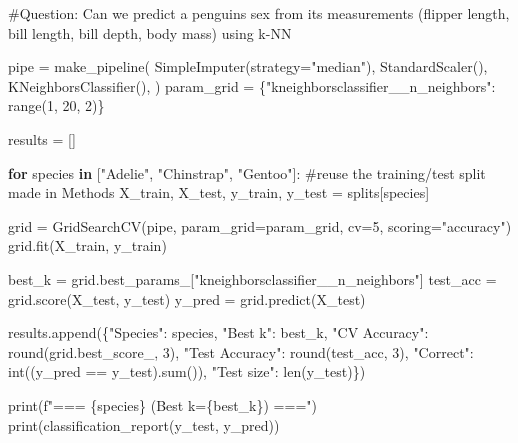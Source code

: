 \documentclass[
  letterpaper,
  DIV=11,
  numbers=noendperiod]{scrartcl}
\newenvironment{Shaded}{\begin{snugshade}}{\end{snugshade}}
\newcommand{\BuiltInTok}[1]{\textcolor[rgb]{0.00,0.23,0.31}{#1}}
\newcommand{\CommentTok}[1]{\textcolor[rgb]{0.37,0.37,0.37}{#1}}
\newcommand{\ControlFlowTok}[1]{\textcolor[rgb]{0.00,0.23,0.31}{\textbf{#1}}}
\newcommand{\DecValTok}[1]{\textcolor[rgb]{0.68,0.00,0.00}{#1}}
\newcommand{\KeywordTok}[1]{\textcolor[rgb]{0.00,0.23,0.31}{\textbf{#1}}}
\newcommand{\NormalTok}[1]{\textcolor[rgb]{0.00,0.23,0.31}{#1}}
\newcommand{\OperatorTok}[1]{\textcolor[rgb]{0.37,0.37,0.37}{#1}}
\newcommand{\SpecialCharTok}[1]{\textcolor[rgb]{0.37,0.37,0.37}{#1}}
\newcommand{\SpecialStringTok}[1]{\textcolor[rgb]{0.13,0.47,0.30}{#1}}
\newcommand{\StringTok}[1]{\textcolor[rgb]{0.13,0.47,0.30}{#1}}
\begin{document}
\begin{Shaded}
\begin{Highlighting}[]
\CommentTok{\#Question: Can we predict a penguin\textquotesingle{}s sex from its measurements (flipper length, bill length, bill depth, body mass) using k{-}NN}

\NormalTok{pipe }\OperatorTok{=}\NormalTok{ make\_pipeline(}
\NormalTok{    SimpleImputer(strategy}\OperatorTok{=}\StringTok{"median"}\NormalTok{),}
\NormalTok{    StandardScaler(),}
\NormalTok{    KNeighborsClassifier(),}
\NormalTok{)}
\NormalTok{param\_grid }\OperatorTok{=}\NormalTok{ \{}\StringTok{"kneighborsclassifier\_\_n\_neighbors"}\NormalTok{: }\BuiltInTok{range}\NormalTok{(}\DecValTok{1}\NormalTok{, }\DecValTok{20}\NormalTok{, }\DecValTok{2}\NormalTok{)\}}

\NormalTok{results }\OperatorTok{=}\NormalTok{ []}

\ControlFlowTok{for}\NormalTok{ species }\KeywordTok{in}\NormalTok{ [}\StringTok{"Adelie"}\NormalTok{, }\StringTok{"Chinstrap"}\NormalTok{, }\StringTok{"Gentoo"}\NormalTok{]:}
    \CommentTok{\#reuse the training/test split made in Methods}
\NormalTok{    X\_train, X\_test, y\_train, y\_test }\OperatorTok{=}\NormalTok{ splits[species]}

\NormalTok{    grid }\OperatorTok{=}\NormalTok{ GridSearchCV(pipe, param\_grid}\OperatorTok{=}\NormalTok{param\_grid, cv}\OperatorTok{=}\DecValTok{5}\NormalTok{, scoring}\OperatorTok{=}\StringTok{"accuracy"}\NormalTok{)}
\NormalTok{    grid.fit(X\_train, y\_train)}

\NormalTok{    best\_k }\OperatorTok{=}\NormalTok{ grid.best\_params\_[}\StringTok{"kneighborsclassifier\_\_n\_neighbors"}\NormalTok{]}
\NormalTok{    test\_acc }\OperatorTok{=}\NormalTok{ grid.score(X\_test, y\_test)}
\NormalTok{    y\_pred }\OperatorTok{=}\NormalTok{ grid.predict(X\_test)}

\NormalTok{    results.append(\{}\StringTok{"Species"}\NormalTok{: species, }\StringTok{"Best k"}\NormalTok{: best\_k, }\StringTok{"CV Accuracy"}\NormalTok{: }\BuiltInTok{round}\NormalTok{(grid.best\_score\_, }\DecValTok{3}\NormalTok{), }\StringTok{"Test Accuracy"}\NormalTok{: }\BuiltInTok{round}\NormalTok{(test\_acc, }\DecValTok{3}\NormalTok{),}
                    \StringTok{"Correct"}\NormalTok{: }\BuiltInTok{int}\NormalTok{((y\_pred }\OperatorTok{==}\NormalTok{ y\_test).}\BuiltInTok{sum}\NormalTok{()), }\StringTok{"Test size"}\NormalTok{: }\BuiltInTok{len}\NormalTok{(y\_test)\})}

    \BuiltInTok{print}\NormalTok{(}\SpecialStringTok{f"=== }\SpecialCharTok{\{}\NormalTok{species}\SpecialCharTok{\}}\SpecialStringTok{ (Best k=}\SpecialCharTok{\{}\NormalTok{best\_k}\SpecialCharTok{\}}\SpecialStringTok{) ==="}\NormalTok{)}
    \BuiltInTok{print}\NormalTok{(classification\_report(y\_test, y\_pred))}
\end{Highlighting}
\end{Shaded}
\end{document}
